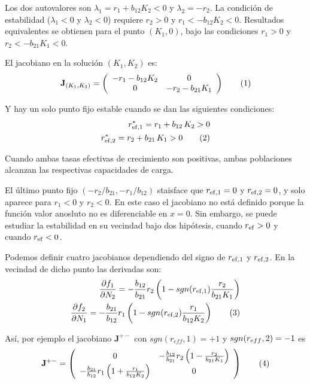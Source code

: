 Los dos autovalores son $\lambda_1=r_{1}+b_{12}K_2<0$ y $\lambda_2=- r_{2}$. La condición de estabilidad ($\lambda_{1}<0$ y $\lambda_{2}<0$) requiere $r_{2} > 0$ y $r_{1}<-b_{12}K_{2}<0$. Resultados equivalentes se obtienen para el punto $(K_1,0)$, bajo las condiciones $r_{1} > 0$ y $r_{2}<-b_{21}K_{1}<0$.

El jacobiano en la solución $(K_1,K_2)$ es: 
\begin{equation}
\mathbf{J}_{\left(K_1,K_2\right)}= \left(
  \begin{array}{cc}
    -r_1-b_{12}K_2 & 0\\
    0 & -r_2-b_{21}K_1
    \end{array} \right)
\stepcounter{equation}\tag{\theequation}\label{eq:JacobK1K2}
\end{equation}

Y hay un solo punto fijo estable cuando se dan las siguientes condiciones:
\begin{align*}
\displaystyle r^{\ast}_{\rm{ef},1} = r_{1} + b_{12}\, K_2 > 0 \\
\displaystyle r^{\ast}_{\rm{ef},2} = r_{2} + b_{21}\, K_1 > 0
\stepcounter{equation}\tag{\theequation}\label{eq:conditio2}
\end{align*}

Cuando ambas tasas efectivas de crecimiento son positivas, ambas poblaciones alcanzan las respectivas capacidades de carga.

El último punto fijo $({-r_{2}}/{b_{21}}, {-r_{1}}/{b_{12}})$ staisface que $r_{\rm{ef},1}=0$ y $r_{\rm{ef},2}=0$, y solo aparece para $r_{1}<0$ y $r_{2}<0$. En este caso el jacobiano no está definido porque la función valor anosluto no es diferenciable en $x=0$. Sin embargo, se puede estudiar la estabilidad en su vecindad bajo dos hipótesis, cuando $r_{\rm{ef}}>0$ y cuando $r_{\rm{ef}}<0$.

Podemos definir cuatro jacobianos dependiendo del signo de $r_{\rm{ef},1}$ y $r_{\rm{ef},2}$. En la vecindad de dicho punto las derivadas son:
\begin{align*}
\displaystyle \frac{\partial f_1}{\partial N_2} = -\frac{b_{12}}{b_{21}}r_2\left(1-sgn(r_{\rm{ef},1})\frac{r_2}{b_{21}K_1} \right)\\
\displaystyle \frac{\partial f_2}{\partial N_1} = -\frac{b_{21}}{b_{12}}r_1\left(1-sgn(r_{\rm{ef},2})\frac{r_1}{b_{12}K_2} \right)
\stepcounter{equation}\tag{\theequation}\label{eq:deriv_reff_0}
\end{align*}

Así, por ejemplo el jacobiano $\mathbf{J}^{+-}$ con $sgn(r_{eff},1)=+1$ y $sgn(r_{eff},\break2)=-1$ es
\begin{equation}
\mathbf{J}^{+-}= \left(
  \begin{array}{cc}
    0 & -\frac{b_{12}}{b_{21}}r_2\left(1-\frac{r_2}{b_{21}K_1} \right)\\
    -\frac{b_{21}}{b_{12}}r_1\left(1+\frac{r_1}{b_{12}K_2} \right)  & 0
    \end{array} \right)
\stepcounter{equation}\tag{\theequation}\label{eq:Jacob+-}
\vspace*{5mm}
\end{equation}

